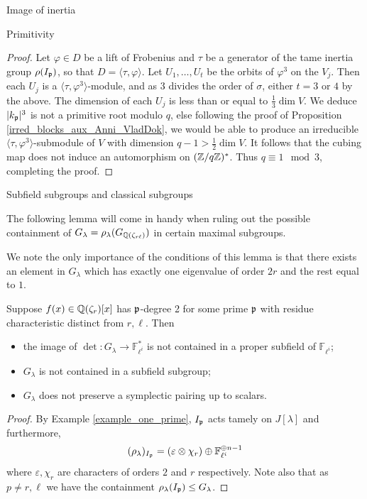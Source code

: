 \documentclass[11pt,a4paper]{article}
\newcommand{\Fli}{\mathbb{F}_{\ell^i}}
\newcommand{\Qr}{{\QQ(\zeta_r)}}
\newcommand{\GQrl}{G_{\QQ(\zeta_{r\ell})}}
\newcommand{\Glam}{G_{\lambda}}
\begin{document}
\begin{section}{Image of inertia}
\begin{subsection}{Primitivity}
\begin{proof}
Let $\varphi \in D$ be a lift of Frobenius and $\tau$ be a generator of the tame inertia group $\rho(I_{\mathfrak{p}})$, so that $D = \langle \tau, \varphi \rangle$.
Let $U_1, \ldots,U_t$ be the orbits of $\varphi^3$ on the $V_j$.
Then each $U_j$ is a $\langle \tau, \varphi^3 \rangle$-module, and as $3$ divides the order of $\sigma$, either $t=3$ or $4$ by the above. The dimension of each $U_j$ is less than or equal to $\frac{1}{3} \dim V$.
We deduce $|k_{\mathfrak{p}}|^3$ is not a primitive root modulo $q$, else following the proof of Proposition \ref{irred_blocks_aux_Anni_VladDok}, we would be able to produce an irreducible $\langle \tau, \varphi^3 \rangle$-submodule of $V$ with dimension $q-1> \frac{1}{2} \dim V$.
It follows that the cubing map does not induce an automorphism on $(\mathbb{Z}/q\mathbb{Z})^*$.
Thus $q\equiv 1 \mod{3}$, completing the proof.
\end{proof}
\end{subsection}

\begin{subsection}{Subfield subgroups and classical subgroups}
    \label{ss:ruling_out_subfield_sbgps_and_classical_sbgps}


The following lemma will come in handy when ruling out the possible containment of $\Glam = \rho_\lambda(\GQrl)$ in certain maximal subgroups.

We note the only importance of the conditions of this lemma is that there exists an element in $G_\lambda$ which has exactly one eigenvalue of order $2r$ and the rest equal to $1$. 

\begin{lemma}
\label{lemma_not_subfld_sbgp_not_in_GSp_n}
Suppose $f(x) \in \Qr[x]$ has $\mathfrak{p}$-degree 2 for some prime $\mathfrak{p}$ with residue characteristic distinct from $ r,\ell$.
Then \begin{itemize}
    \item the image of $\det\colon G_\lambda \rightarrow \Fli^*$ is not contained in a proper subfield of $\Fli$;
    \item $G_\lambda$ is not contained in a subfield subgroup;
    \item $G_\lambda$ does not preserve a symplectic pairing up to scalars.
\end{itemize}
\end{lemma}
\begin{proof}
By Example \ref{example_one_prime},  $I_{\mathfrak{p}}$ acts tamely on $J[\lambda]$ and furthermore,
\[(\rho_\lambda)_{I_\p} = (\varepsilon \otimes \chi_r ) \oplus \Fli^{\oplus n-1}\] where $\varepsilon, \chi_r$ are characters of orders $2$ and $r$ respectively. Note also that as $p \neq r,\ell$ we have the containment $\rho_\lambda(I_\p) \leq \Glam$.


\end{proof}
\end{subsection}
\end{section}
\end{document}
